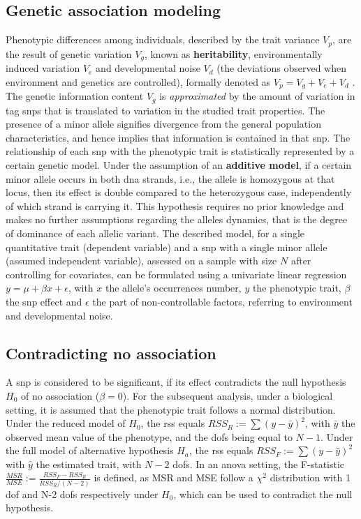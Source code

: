 \subsection{Genetic association modeling}
Phenotypic differences among individuals, described by the trait variance $V_p$,  are the result of genetic variation $V_g$, known as \textbf{heritability}, environmentally induced variation $V_e$ and developmental noise $V_d$ (the deviations observed when environment and genetics are controlled), formally denoted as $V_p=V_g+V_e+V_d$ \cite{Vogt2020}. The genetic information content $V_g$ is \textit{approximated} by the amount of variation in tag \acp{snp} that is translated to variation in the studied trait properties.  The presence of a minor allele signifies divergence from the general population characteristics, and hence implies that information is contained in that \ac{snp}.  The relationship of each \ac{snp} with the phenotypic trait is statistically represented by a certain genetic model. Under the assumption of an \textbf{additive model}, if a certain minor allele occurs in both \ac{dna} strands, i.e., the allele is homozygous at that locus, then its effect is double compared to the heterozygous case, independently of which strand is carrying it. This hypothesis requires no prior knowledge and makes no further assumptions regarding the alleles dynamics, that is the degree of dominance of each allelic variant.  The described model, for a single quantitative trait (dependent variable) and a \ac{snp} with a single minor allele (assumed independent variable), assessed on a sample with size $N$ after controlling for covariates, can be formulated using a univariate linear regression $y = \mu + \beta x + \epsilon$, with $x$ the allele's occurrences number, $y$ the phenotypic trait, $\beta$ the \ac{snp} effect and $\epsilon$ the part of non-controllable factors, referring to environment and developmental noise. 

\subsection{Contradicting no association}
A \ac{snp} is considered to be significant, if its effect contradicts the null hypothesis $H_0$ of no association ($\beta=0$). For the subsequent analysis, under a biological setting, it is assumed that the phenotypic trait follows a normal distribution. Under the reduced model of $H_0$, the \ac{rss} equals $RSS_R:=\sum{(y-\bar{y})^2}$, with $\bar{y}$ the observed mean value of the phenotype, and the \acp{dof} being equal to $N-1$. Under the full model of alternative hypothesis $H_a$, the \ac{rss} equals $RSS_F:=\sum{(y-\hat{y})^2}$ with $\hat{y}$ the estimated trait, with $N-2$ \acp{dof}. In an \ac{anova} setting, the F-statistic $\frac{MSR}{MSE}:=\frac{RSS_F-RSS_R}{RSS_R/(N-2)}$ is defined, as MSR and MSE follow a $\chi^2$ distribution with 1 \ac{dof} and N-2 \acp{dof} respectively under $H_0$, which can be used to contradict the null hypothesis. 

